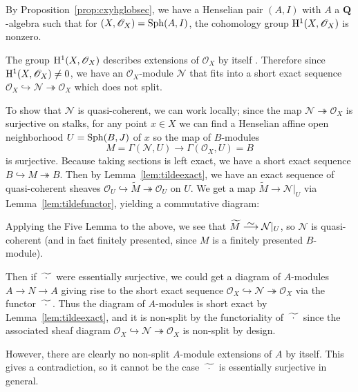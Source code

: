 \documentclass[12pt]{article}
\newcommand\simto{\stackrel{\textstyle\sim}{\smash{\longrightarrow}\rule{0pt}{0.4ex}}}
\renewcommand{\O}{\mathscr{O}}
\newcommand{\Q}{\mathbf{Q}}
\newcommand{\sph}{{\rm Sph}}
\newcommand{\mc}[1]{\mathcal{#1}}
\renewcommand{\H}{{\rm H}}
\newcommand{\spcite}[2]{\cite[\href{https://stacks.math.columbia.edu/tag/#1}{{#2} {#1}}]{stackp}}
\theoremstyle{definition}
\newenvironment{example}
  {\pushQED{\qed}\renewcommand{\qedsymbol}{$\blacksquare$}\examplex}
  {\popQED\endexamplex}
\numberwithin{equation}{subsection}
\begin{document}
\begin{example}\label{ex:grecowrong} By Proposition~\ref{prop:cxyhglobsec}, we have a Henselian pair $(A,I)$ with $A$ a $\Q$-algebra such that for $(X,\O_X)=\sph(A,I)$, the cohomology group $\H^1(X,\O_X)$ is nonzero.


The group $\H^1(X,\O_X)$ describes extensions of $\O_X$ by itself \spcite{0B39}{Lemma}. Therefore since $\H^1(X,\O_X) \ne 0$, we have an $\O_X$-module $\mc{N}$ that fits into a short exact sequence $\O_X \hookrightarrow \mc{N} \twoheadrightarrow \O_X$ which does not split. 

To show that $\mc{N}$ is quasi-coherent, we can work locally; since the map $\mc{N} \twoheadrightarrow \O_X$ is surjective on stalks, for any point $x \in X$ we can find a Henselian affine open neighborhood $U=\sph(B,J)$ of $x$ so the map of $B$-modules $$M=\Gamma(\mc{N},U) \to \Gamma(\O_X,U)=B$$ is surjective. Because taking sections is left exact, we have a short exact sequence  $B \hookrightarrow M \twoheadrightarrow B$. Then by Lemma~\ref{lem:tildeexact}, we have an exact sequence of quasi-coherent sheaves $\O_U \hookrightarrow \widetilde{M} \twoheadrightarrow \O_U$ on $U$. We get a map $\widetilde{M} \to \mc{N}|_U$ via Lemma~\ref{lem:tildefunctor}, yielding a commutative diagram:
\vspace{-.25in}
\begin{center}
\end{center}\vspace{-.35in}

Applying the Five Lemma to the above, we see that $\widetilde{M} \simto \mc{N}|_U$, so $\mc{N}$ is quasi-coherent (and in fact finitely presented, since $M$ is a finitely presented $B$-module).



Then if $\fwt$ were essentially surjective, we could get a diagram of $A$-modules $A \to N \to A$ giving rise to the short exact sequence $\O_X \hookrightarrow \mc{N} \twoheadrightarrow \O_X$ via the functor $\fwt$. Thus the diagram of $A$-modules is short exact by Lemma~\ref{lem:tildeexact}, and it is non-split by the functoriality of $\fwt$ since the associated sheaf diagram $\O_X \hookrightarrow \mc{N} \twoheadrightarrow \O_X$ is non-split by design.

However, there are clearly no non-split $A$-module extensions of $A$ by itself. This gives a contradiction, so it cannot be the case $\fwt$ is essentially surjective in general. \end{example}
\end{document}
